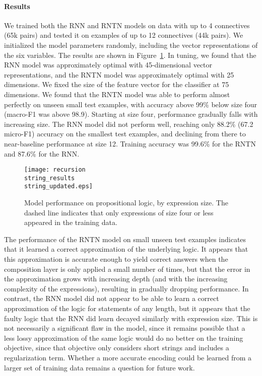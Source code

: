 \paragraph{Results} 
We trained both the RNN and RNTN models on data with up to 4
connectives (65k pairs) and tested it on examples of up to 12
connectives (44k pairs). We initialized the model parameters randomly,
including the vector representations of the six variables. The results
are shown in Figure~\ref{prop-results}. In tuning, we found that the
RNN model was approximately optimal with 45-dimensional vector
representations, and the RNTN model was approximately optimal with 25
dimensions. We fixed the size of the feature vector for the classifier
at 75 dimensions. We found that the RNTN model was able to perform
almost perfectly on unseen small test examples, with accuracy above
99\% below size four (macro-F1 was above 98.9).  Starting at size
four, performance gradually falls with increasing size.  The RNN model
did not perform well, reaching only 88.2\% (67.2 micro-F1) accuracy on
the smallest test examples, and declining from there to near-baseline
performance at size 12. Training accuracy was 99.6\% for the RNTN and
87.6\% for the RNN.


\begin{figure}[tp]
  \centering
  \texttt{[image: recursion\\string\_results\\string\_updated.eps]}
  \caption{Model performance on propositional logic, by expression size. 
    The dashed line indicates that only expressions of size four or less appeared in the training data.}  
  \label{prop-results}
\end{figure}

The performance of the RNTN model on small unseen test examples
indicates that it learned a correct approximation of the underlying
logic. It appears that this approximation is accurate enough to yield
correct answers when the composition layer is only applied a small
number of times, but that the error in the approximation grows with
increasing depth (and with the increasing complexity of the
expressions), resulting in gradually dropping performance. In
contrast, the RNN model did not appear to be able to learn a correct
approximation of the logic for statements of any length, but it
appears that the faulty logic that the RNN did learn decayed similarly
with expression size.  This is not necessarily a significant flaw in
the model, since it remains possible that a less lossy approximation
of the same logic would do no better on the training objective, since
that objective only considers short strings and includes a
regularization term. Whether a more accurate encoding could be learned
from a larger set of training data remains a question for future
work. 

